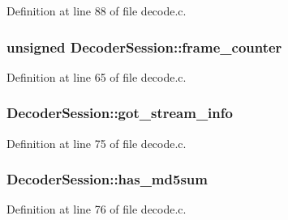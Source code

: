 Definition at line 88 of file decode.\+c.

\subsubsection[{\texorpdfstring{frame\+\_\+counter}{frame_counter}}]{\setlength{\rightskip}{0pt plus 5cm}unsigned Decoder\+Session\+::frame\+\_\+counter}\hypertarget{struct_decoder_session_a146f9da6b91d9939135223afa7a1c5df}{}\label{struct_decoder_session_a146f9da6b91d9939135223afa7a1c5df}


Definition at line 65 of file decode.\+c.

\subsubsection[{\texorpdfstring{got\+\_\+stream\+\_\+info}{got_stream_info}}]{ Decoder\+Session\+::got\+\_\+stream\+\_\+info}\hypertarget{struct_decoder_session_a5cd16e290c22282106c647ac1d0dc8ca}{}\label{struct_decoder_session_a5cd16e290c22282106c647ac1d0dc8ca}


Definition at line 75 of file decode.\+c.

\subsubsection[{\texorpdfstring{has\+\_\+md5sum}{has_md5sum}}]{ Decoder\+Session\+::has\+\_\+md5sum}\hypertarget{struct_decoder_session_a170ff40c257b7503511652e7fa8c7e58}{}\label{struct_decoder_session_a170ff40c257b7503511652e7fa8c7e58}


Definition at line 76 of file decode.\+c.

